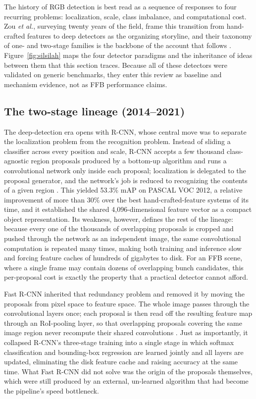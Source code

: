 The history of RGB detection is best read as a sequence of responses to four recurring problems: localization, scale, class imbalance, and computational cost. Zou \textit{et al.}, surveying twenty years of the field, frame this transition from hand-crafted features to deep detectors as the organizing storyline, and their taxonomy of one- and two-stage families is the backbone of the account that follows \cite{zou2023objectdetectionsurvey}. Figure~\ref{fig:silsilah} maps the four detector paradigms and the inheritance of ideas between them that this section traces. Because all of these detectors were validated on generic benchmarks, they enter this review as baseline and mechanism evidence, not as FFB performance claims.

\subsection{The two-stage lineage (2014--2021)}

The deep-detection era opens with R-CNN, whose central move was to separate the localization problem from the recognition problem. Instead of sliding a classifier across every position and scale, R-CNN accepts a few thousand class-agnostic region proposals produced by a bottom-up algorithm and runs a convolutional network only inside each proposal; localization is delegated to the proposal generator, and the network's job is reduced to recognizing the contents of a given region \cite{girshick2014rcnn}. This yielded 53.3\% mAP on PASCAL VOC 2012, a relative improvement of more than 30\% over the best hand-crafted-feature systems of its time, and it established the shared 4{,}096-dimensional feature vector as a compact object representation. Its weakness, however, defines the rest of the lineage: because every one of the thousands of overlapping proposals is cropped and pushed through the network as an independent image, the same convolutional computation is repeated many times, making both training and inference slow and forcing feature caches of hundreds of gigabytes to disk. For an FFB scene, where a single frame may contain dozens of overlapping bunch candidates, this per-proposal cost is exactly the property that a practical detector cannot afford.

Fast R-CNN inherited that redundancy problem and removed it by moving the proposals from pixel space to feature space. The whole image passes through the convolutional layers once; each proposal is then read off the resulting feature map through an RoI-pooling layer, so that overlapping proposals covering the same image region never recompute their shared convolutions \cite{girshick2015fastrcnn}. Just as importantly, it collapsed R-CNN's three-stage training into a single stage in which softmax classification and bounding-box regression are learned jointly and all layers are updated, eliminating the disk feature cache and raising accuracy at the same time. What Fast R-CNN did not solve was the origin of the proposals themselves, which were still produced by an external, un-learned algorithm that had become the pipeline's speed bottleneck.

